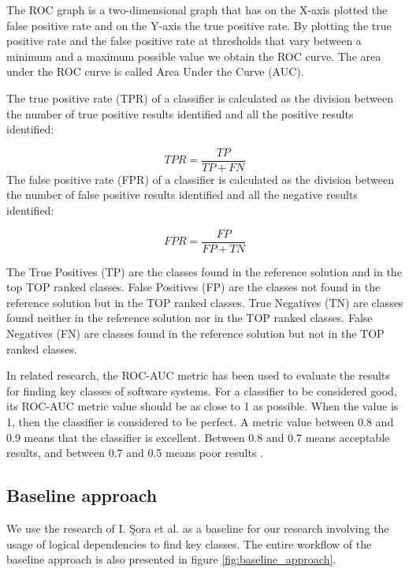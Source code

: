 The ROC graph is a two-dimensional graph that has on the X-axis plotted the false positive rate and on the Y-axis the true positive rate. By plotting the true positive rate and the false positive rate at thresholds that vary between a minimum and a maximum possible value we obtain the ROC curve. The area under the ROC curve is called Area Under the Curve (AUC).

The true positive rate (TPR) of a classifier is calculated as the division between the number of true positive results identified and all the positive results identified:

\begin{equation}
TPR = \frac{TP}{TP+FN}
\end{equation}
The false positive rate (FPR) of a classifier is calculated as the division between the number of false positive results identified and all the negative results identified:

\begin{equation}
FPR = \frac{FP}{FP+TN}
\end{equation}


The True Positives (TP) are the classes found in the reference solution and in the top TOP ranked classes. False Positives (FP) are the classes not found in the reference solution but in the TOP ranked classes.
True Negatives (TN) are classes found neither in the reference solution nor in the TOP ranked classes. False Negatives (FN) are classes found in the reference solution but not in the TOP ranked classes.

In related research, the ROC-AUC metric has been used to evaluate the results for finding key classes of software systems. For a classifier to be considered good, its ROC-AUC metric value should be as close to 1 as possible.
When the value is 1, then the classifier is considered to be perfect. A metric value between 0.8 and 0.9 means that the classifier is excellent. Between 0.8 and 0.7 means acceptable results, and between 0.7 and 0.5 means poor results \cite{ROC_METRIC_VALS, b4}. 



\subsection{Baseline approach}
\label{subsec:key_previous_measurements}

\hspace{4em}We use the research of I. Şora et al. \cite{Finding-key-classes} as a baseline for our research involving the usage of logical dependencies to find key classes. The entire workflow of the baseline approach is also presented in figure \ref{fig:baseline_approach}.

